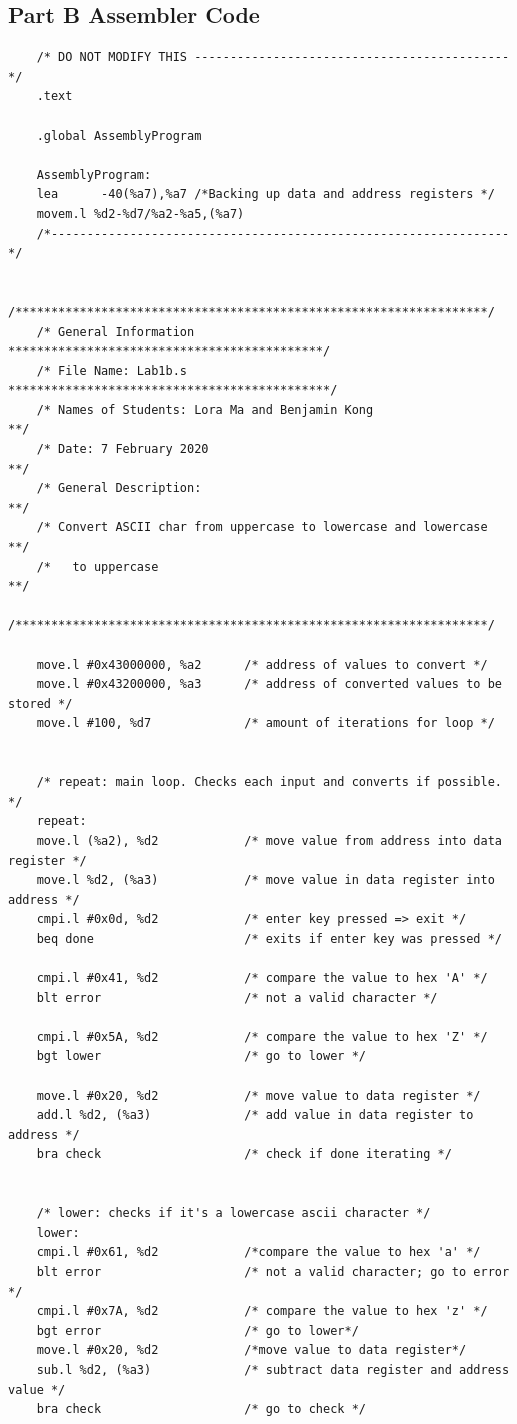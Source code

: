 \documentclass[10pt, letterpaper, titlepage]{article} %
\begin{document}
\subsection{Part B Assembler Code}
\begin{lstlisting}
	/* DO NOT MODIFY THIS --------------------------------------------*/
	.text
	
	.global AssemblyProgram
	
	AssemblyProgram:
	lea      -40(%a7),%a7 /*Backing up data and address registers */
	movem.l %d2-%d7/%a2-%a5,(%a7)
	/*----------------------------------------------------------------*/
	
	/******************************************************************/
	/* General Information ********************************************/
	/* File Name: Lab1b.s *********************************************/
	/* Names of Students: Lora Ma and Benjamin Kong                  **/
	/* Date: 7 February 2020                                         **/
	/* General Description:                                          **/
	/* Convert ASCII char from uppercase to lowercase and lowercase  **/
	/*   to uppercase                                                **/
	/******************************************************************/
	
	move.l #0x43000000, %a2      /* address of values to convert */
	move.l #0x43200000, %a3      /* address of converted values to be stored */
	move.l #100, %d7             /* amount of iterations for loop */
	
	
	/* repeat: main loop. Checks each input and converts if possible. */
	repeat:
	move.l (%a2), %d2            /* move value from address into data register */
	move.l %d2, (%a3)            /* move value in data register into address */
	cmpi.l #0x0d, %d2            /* enter key pressed => exit */
	beq done                     /* exits if enter key was pressed */
	
	cmpi.l #0x41, %d2            /* compare the value to hex 'A' */
	blt error                    /* not a valid character */
	
	cmpi.l #0x5A, %d2            /* compare the value to hex 'Z' */
	bgt lower                    /* go to lower */
	
	move.l #0x20, %d2            /* move value to data register */
	add.l %d2, (%a3)             /* add value in data register to address */
	bra check                    /* check if done iterating */
	
	
	/* lower: checks if it's a lowercase ascii character */
	lower:
	cmpi.l #0x61, %d2            /*compare the value to hex 'a' */
	blt error                    /* not a valid character; go to error */
	cmpi.l #0x7A, %d2            /* compare the value to hex 'z' */
	bgt error                    /* go to lower*/
	move.l #0x20, %d2            /*move value to data register*/
	sub.l %d2, (%a3)             /* subtract data register and address value */
	bra check                    /* go to check */
	

\end{lstlisting}
\end{document}
